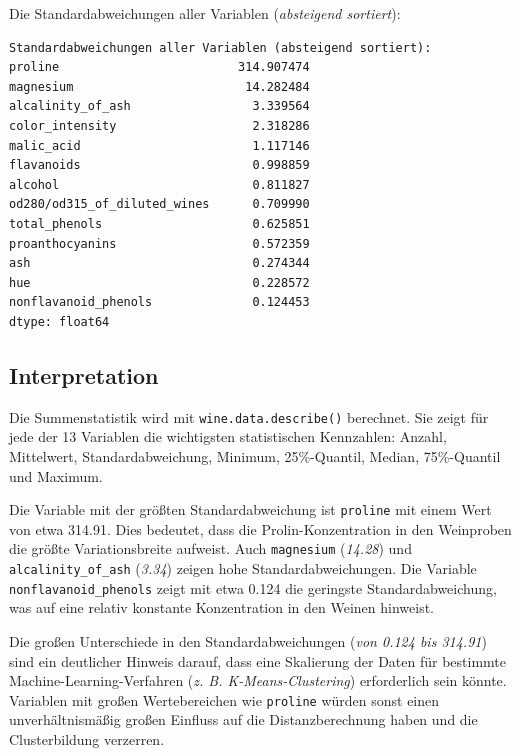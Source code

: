 Die Standardabweichungen aller Variablen (\textit{absteigend sortiert}):

\begin{verbatim}
Standardabweichungen aller Variablen (absteigend sortiert):
proline                         314.907474
magnesium                        14.282484
alcalinity_of_ash                 3.339564
color_intensity                   2.318286
malic_acid                        1.117146
flavanoids                        0.998859
alcohol                           0.811827
od280/od315_of_diluted_wines      0.709990
total_phenols                     0.625851
proanthocyanins                   0.572359
ash                               0.274344
hue                               0.228572
nonflavanoid_phenols              0.124453
dtype: float64
\end{verbatim}

\subsection{Interpretation}

Die Summenstatistik wird mit \texttt{wine.data.describe()} berechnet. Sie zeigt für jede der 13 Variablen die wichtigsten statistischen Kennzahlen: Anzahl, Mittelwert, Standardabweichung, Minimum, 25\%-Quantil, Median, 75\%-Quantil und Maximum.

Die Variable mit der größten Standardabweichung ist \texttt{proline} mit einem Wert von etwa 314.91. Dies bedeutet, dass die Prolin-Konzentration in den Weinproben die größte Variationsbreite aufweist. Auch \texttt{magnesium} (\textit{14.28}) und \texttt{alcalinity\_of\_ash} (\textit{3.34}) zeigen hohe Standardabweichungen. Die Variable \texttt{nonflavanoid\_phenols} zeigt mit etwa 0.124 die geringste Standardabweichung, was auf eine relativ konstante Konzentration in den Weinen hinweist.

Die großen Unterschiede in den Standardabweichungen (\textit{von 0.124 bis 314.91}) sind ein deutlicher Hinweis darauf, dass eine Skalierung der Daten für bestimmte Machine-Learning-Verfahren (\textit{\acs{z. B.} K-Means-Clustering}) erforderlich sein könnte. Variablen mit großen Wertebereichen wie \texttt{proline} würden sonst einen unverhältnismäßig großen Einfluss auf die Distanzberechnung haben und die Clusterbildung verzerren.

\cleardoublepage


